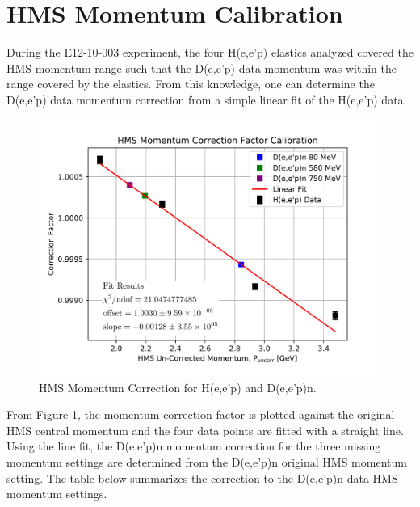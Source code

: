\documentclass[11pt]{article}
\begin{document}
\section{HMS Momentum Calibration}
During the E12-10-003 experiment, the four H(e,e'p) elastics analyzed covered the HMS momentum range such that the D(e,e'p) data
momentum was within the range covered by the elastics. From this knowledge, one can determine the D(e,e'p) data momentum correction
from a simple linear fit of the H(e,e'p) data. 
\newpage
\begin{figure}[h!]
  \centering
  \includegraphics[scale=0.4]{plots/HMS_Pcorr_Fit.pdf}
  \caption{HMS Momentum Correction for H(e,e'p) and D(e,e'p)n. }
  \label{fig:hms_Pcorr}
\end{figure} 
\indent From Figure \ref{fig:hms_Pcorr}, the momentum correction factor is plotted against the original HMS central momentum and the
four data points are fitted with a straight line. Using the line fit, the D(e,e'p)n momentum correction for the three missing
momentum settings are determined from the D(e,e'p)n original HMS momentum setting. The table below summarizes the
correction to the D(e,e'p)n data HMS momentum settings.
\end{document}
